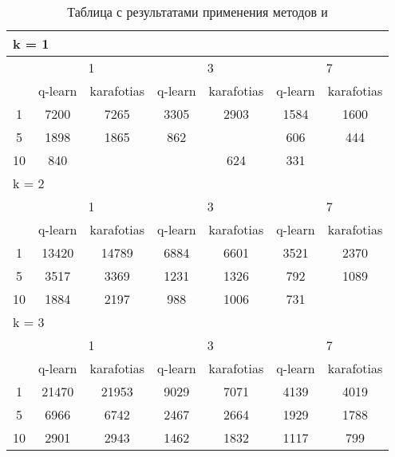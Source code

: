 \begin{table}
  \centering
  \begin{tabular}{|*7{c|}}
  \hline
  \multicolumn{7}{|l|}{k = 1} \\
  \hline
  \multirow{2}{*}{\diagbox{$\mu$}{$\lambda$}} & \multicolumn{2}{c|}{1} & \multicolumn{2}{c|}{3} & \multicolumn{2}{c|}{7} \\
  \cline{2-7}
  & q-learn & karafotias & q-learn & karafotias & q-learn & karafotias \\
  \hline
  1 & 7200 & 7265 & 3305 & 2903 & 1584 & 1600 \\
  \hline
  5 & 1898 & 1865 & 862 & \cellcolor{olive}{794} & 606 & 444 \\
  \hline
  10 & 840& \cellcolor{olive}{804} & \cellcolor{olive}{502} & 624 & 331 & \cellcolor{olive}{294} \\
  \hline
  \multicolumn{7}{|l|}{k = 2} \\
  \hline
  \multirow{2}{*}{\diagbox{$\mu$}{$\lambda$}} & \multicolumn{2}{c|}{1} & \multicolumn{2}{c|}{3} & \multicolumn{2}{c|}{7} \\
  \cline{2-7}
  & q-learn & karafotias & q-learn & karafotias & q-learn & karafotias \\
  \hline
  1 & 13420 & 14789 & 6884 & 6601 & 3521 & 2370 \\
  \hline
  5 & 3517 & 3369 & 1231 & 1326 & 792 & 1089 \\
  \hline
  10 & 1884 & 2197 & 988 & 1006 & 731& \cellcolor{olive}{564} \\
  \hline
  \multicolumn{7}{|l|}{k = 3} \\
  \hline
  \multirow{2}{*}{\diagbox{$\mu$}{$\lambda$}} & \multicolumn{2}{c|}{1} & \multicolumn{2}{c|}{3} & \multicolumn{2}{c|}{7} \\
  \cline{2-7}
  & q-learn & karafotias & q-learn & karafotias & q-learn & karafotias \\
  \hline
  1 & 21470 & 21953 & 9029 & 7071 & 4139 & 4019 \\
  \hline
  5 & 6966 & 6742& 2467 & 2664 & 1929 & 1788 \\
  \hline
  10 & 2901 & 2943 & 1462 & 1832 & 1117 & 799 \\
  \hline
  \end{tabular}
  \captionsetup{justification=centering}
  \caption{Таблица с результатами применения методов  и }
\end{table}

